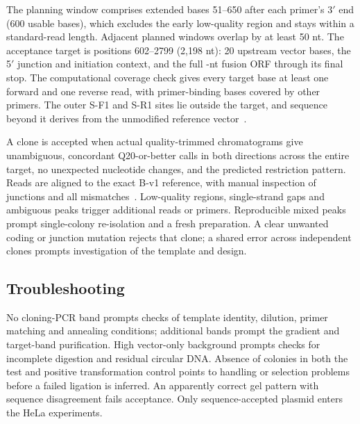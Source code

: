 The planning window comprises extended bases 51--650 after each primer's 3$'$ end (600 usable bases), which excludes the early low-quality region and stays within a standard-read length. Adjacent planned windows overlap by at least 50 nt. The acceptance target is positions 602--2799 (2,198 nt): 20 upstream vector bases, the 5$'$ junction and initiation context, and the full \FusionORFNt{}-nt fusion ORF through its final stop. The computational coverage check gives every target base at least one forward and one reverse read, with primer-binding bases covered by other primers. The outer S-F1 and S-R1 sites lie outside the target, and sequence beyond it derives from the unmodified reference vector~\cite{MethodM13,MethodM14}.

A clone is accepted when actual quality-trimmed chromatograms give unambiguous, concordant Q20-or-better calls in both directions across the entire target, no unexpected nucleotide changes, and the predicted restriction pattern. Reads are aligned to the exact B-v1 reference, with manual inspection of junctions and all mismatches~\cite{MethodM15}. Low-quality regions, single-strand gaps and ambiguous peaks trigger additional reads or primers. Reproducible mixed peaks prompt single-colony re-isolation and a fresh preparation. A clear unwanted coding or junction mutation rejects that clone; a shared error across independent clones prompts investigation of the template and design.

\subsection{Troubleshooting}
No cloning-PCR band prompts checks of template identity, dilution, primer matching and annealing conditions; additional bands prompt the gradient and target-band purification. High vector-only background prompts checks for incomplete digestion and residual circular DNA. Absence of colonies in both the test and positive transformation control points to handling or selection problems before a failed ligation is inferred. An apparently correct gel pattern with sequence disagreement fails acceptance. Only sequence-accepted plasmid enters the HeLa experiments.
